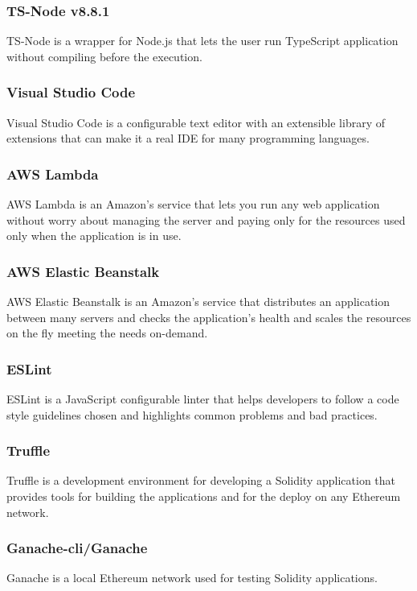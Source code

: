 \subsubsection*{TS-Node v8.8.1}
TS-Node is a wrapper for Node.js that lets the user run TypeScript application without compiling before the execution.

\subsubsection*{Visual Studio Code}
Visual Studio Code is a configurable text editor with an extensible library of extensions that can make it a real IDE for many programming languages.

\subsubsection*{AWS Lambda}
AWS Lambda is an Amazon’s service that lets you run any web application without worry about managing the server and paying only for the resources used only when the application is in use.

\subsubsection*{AWS Elastic Beanstalk}
AWS Elastic Beanstalk is an Amazon’s service that distributes an application between many servers and checks the application’s health and scales the resources on the fly meeting the needs on-demand.

\subsubsection*{ESLint}
ESLint is a JavaScript configurable linter that helps developers to follow a code style guidelines chosen and highlights common problems and bad practices.

\subsubsection*{Truffle}
Truffle is a development environment for developing a Solidity application that provides tools for building the applications and for the deploy on any Ethereum network.

\subsubsection*{Ganache-cli/Ganache}
Ganache is a local Ethereum network used for testing Solidity applications.

